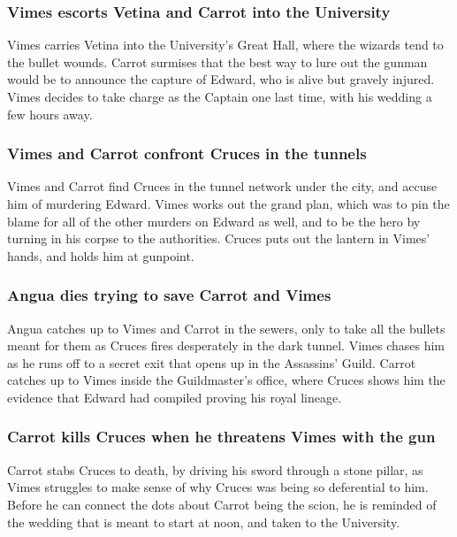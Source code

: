 \subsubsection{\Gls{Vimes} escorts \Gls{Vetina} and \Gls{Carrot} into the University}
\Gls{Vimes} carries \Gls{Vetina} into the University's Great Hall, where the wizards tend to the
bullet wounds. \Gls{Carrot} surmises that the best way to lure out the gunman would be to announce
the capture of \Gls{Edward}, who is alive but gravely injured. \Gls{Vimes} decides to take charge
as the Captain one last time, with his wedding a few hours away.

\subsubsection{\Gls{Vimes} and \Gls{Carrot} confront \Gls{Cruces} in the tunnels}
\Gls{Vimes} and \Gls{Carrot} find \Gls{Cruces} in the tunnel network under the city, and accuse him
of murdering \Gls{Edward}. \Gls{Vimes} works out the grand plan, which was to pin the blame for
all of the other murders on \Gls{Edward} as well, and to be the hero by turning in his corpse to
the authorities. \Gls{Cruces} puts out the lantern in \Gls{Vimes}' hands, and holds him at
gunpoint.

\subsubsection{\Gls{Angua} dies trying to save \Gls{Carrot} and \Gls{Vimes}}
\Gls{Angua} catches up to \Gls{Vimes} and \Gls{Carrot} in the sewers, only to take all the bullets
meant for them as \Gls{Cruces} fires desperately in the dark tunnel. \Gls{Vimes} chases him as he
runs off to a secret exit that opens up in the Assassins' Guild. \Gls{Carrot} catches up to
\Gls{Vimes} inside the Guildmaster's office, where \Gls{Cruces} shows him the evidence that
\Gls{Edward} had compiled proving his royal lineage.

\subsubsection{\Gls{Carrot} kills \Gls{Cruces} when he threatens \Gls{Vimes} with the gun}
\Gls{Carrot} stabs \Gls{Cruces} to death, by driving his sword through a stone pillar, as
\Gls{Vimes} struggles to make sense of why \Gls{Cruces} was being so deferential to him. Before he
can connect the dots about \Gls{Carrot} being the scion, he is reminded of the wedding that is meant
to start at noon, and taken to the University.

